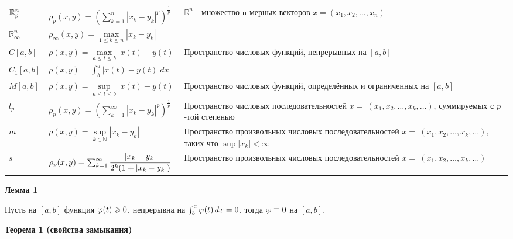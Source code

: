 {\begin{tabularx}{\textwidth}{||l|l|X||}
    $\mathbb{R}^n_p$      & $\rho_p (x, y)=(\sum_{k = 1}^{n}|x_k-y_k|^p)^\frac{1}{p}$                 & \multirow{2}{6cm}{$\mathbb{R}^n$ - множество n-мерных векторов $x=(x_1, x_2, \dots, x_n)$  }                            \\
    \cline{1-2}
    $\mathbb{R}^n_\infty$ & $\rho_\infty (x, y)=\underset{1\leq k\leq n}{\max}|x_k-y_k|$              &                                                                                                                         \\
    \hline
    $C[a, b]$             & $\rho (x, y)=\underset{a \leq t \leq b}{\max}|x(t)-y(t)|$                 & \multirow{2}{6cm}{Пространство числовых функций, непрерывных на $[a, b]$}                                               \\
    \cline{1-2}
    $C_1[a, b]$           & $\rho (x, y)=\int_{b}^{a}|x(t)-y(t)|dx $                                  &                                                                                                                         \\[5pt]
    \hline
    $M[a, b]$             & $\rho (x, y)=\underset{a \leq t \leq b}{\sup}|x(t)-y(t)|$                 & Пространство числовых функций, определённых и ограниченных на $[a, b]$                                                  \\
    \hline
    $l_p$                 & $\rho_p (x, y)=(\sum_{k = 1}^{\infty}|x_k-y_k|^p)^\frac{1}{p}$            & Пространство числовых последовательностей $x=~(x_1, x_2, \dots, x_k, \dots)$, суммируемых с $p$-той степенью            \\
    \hline
    $m$                   & $\rho (x, y)=\underset{k \in \mathbb{N} }{\sup}|x_k-y_k|$                 & Пространство произвольных числовых последовательностей $x=~(x_1, x_2, \dots, x_k, \dots)$, таких что $\sup|x_k|<\infty$ \\
    \hline
    $s$                   & $\rho_p (x, y)=\sum_{k = 1}^{\infty} \cfrac{|x_k-y_k|}{2^k(1+|x_k-y_k|)}$ & Пространство произвольных числовых последовательностей $x=~(x_1, x_2, \dots, x_k, \dots)$                               \\
    \hline
\end{tabularx}}
\hfill \break
\hspace*{8mm}\textbf{Лемма 1}

Пусть на $[a, b]$ функция $\varphi (t) \geqslant 0$, непрерывна на $\int_{b}^{a}\varphi
    (t)\, dx=0$, тогда $\varphi\equiv 0$ на $[a, b]$.

\textbf{Теорема 1 (свойства замыкания) }


